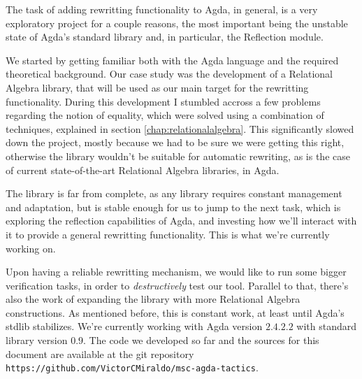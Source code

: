 The task of adding rewritting functionality to Agda, in general, is a very exploratory 
project for a couple reasons, the most important being the unstable state of Agda's
standard library and, in particular, the Reflection module. 

We started by getting familiar both with the Agda language and the required theoretical background. 
Our case study was the development of a Relational Algebra library, 
that will be used as our main target for the rewritting functionality.
During this development I stumbled accross a few problems regarding the notion of equality, 
which were solved using a combination of techniques, explained in section \ref{chap:relationalalgebra}.
This significantly slowed down the project, mostly because we had to be sure we were getting
this right, otherwise the library wouldn't be suitable for automatic rewriting, as is the case
of current state-of-the-art Relational Algebra libraries, in Agda.

The library is far from complete, as any library requires constant
management and adaptation, but is stable enough for us to jump to the next task, which is
exploring the reflection capabilities of Agda, and investing how we'll interact with it
to provide a general rewritting functionality. This is what we're currently working on.

Upon having a reliable rewritting mechanism, we would like to run some bigger verification
tasks, in order to \emph{destructively} test our tool. Parallel to that, there's also the
work of expanding the library with more Relational Algebra constructions. As mentioned before,
this is constant work, at least until Agda's stdlib stabilizes. We're currently working with
Agda version $2.4.2.2$ with standard library version $0.9$. The code we developed so far and
the sources for this document are available at the git repository \texttt{https://github.com/VictorCMiraldo/msc-agda-tactics}.
